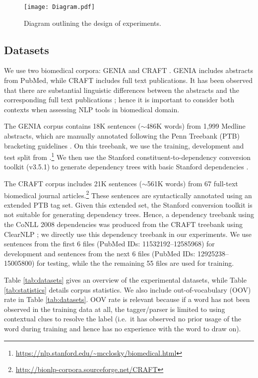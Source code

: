 \documentclass[twocolumn,hyperref]{bmcart}\pdfoutput=1
\newcommand{\CHANGEA}[1]{#1}
\begin{document}
\begin{figure}[t]
    \centering
    \texttt{[image: Diagram.pdf]}
    \caption{\CHANGEA{Diagram outlining the design of experiments.}}
    \label{fig:Diagram}
\end{figure}

\subsection*{Datasets}

We use two biomedical corpora: GENIA \cite{I05-2038} and CRAFT \cite{Verspoor2012}. GENIA includes abstracts from PubMed, while CRAFT includes full text publications. It has been observed that there are substantial linguistic differences between the abstracts and the corresponding full text publications
\cite{cohen2010structural}; hence it is important to consider both contexts when assessing  NLP tools in biomedical domain.

The GENIA corpus contains 18K sentences ({$\sim$}486K words) from 1,999 Medline abstracts, which are manually annotated following the Penn Treebank (PTB) bracketing guidelines \cite{I05-2038}.  
On this  treebank, we use the training, development and test split from \cite{david2010}.\footnote{{\url{https://nlp.stanford.edu/~mcclosky/biomedical.html}}}   
We then use  the Stanford constituent-to-dependency conversion toolkit (v3.5.1) to  generate dependency trees with basic Stanford dependencies \cite{deMarneffe:2008:STD:1608858.1608859}.   

The CRAFT corpus includes 21K sentences ({$\sim$}561K words) from 67 full-text biomedical journal articles.\footnote{\url{http://bionlp-corpora.sourceforge.net/CRAFT}} These sentences are   syntactically annotated using an extended PTB tag set.
Given this extended set, the Stanford conversion toolkit is not  suitable for generating dependency trees. Hence,
a dependency treebank using the CoNLL 2008 dependencies \cite{surdeanu-EtAl:2008:CONLL} was produced from the CRAFT treebank using ClearNLP \cite{Choi2012}; we directly use this dependency treebank in our experiments. We use sentences from the first 6 files (PubMed IDs: 11532192--12585968) for development and sentences from the next 6  files (PubMed IDs: 12925238--15005800) for testing, while the the remaining 55 files are used for training.   

Table  \ref{tab:datasets} gives an overview of the experimental datasets, while  Table  \ref{tab:statistics} details corpus statistics.  \CHANGEA{We also include out-of-vocabulary (OOV)  rate in Table \ref{tab:datasets}. OOV rate is relevant because if a
word has not been observed in the training data at all, the tagger/parser is limited to
using contextual clues to resolve the label (i.e.\ it has observed no prior usage
of the word during training and hence has no experience with the word to
draw on).}
\end{document}
